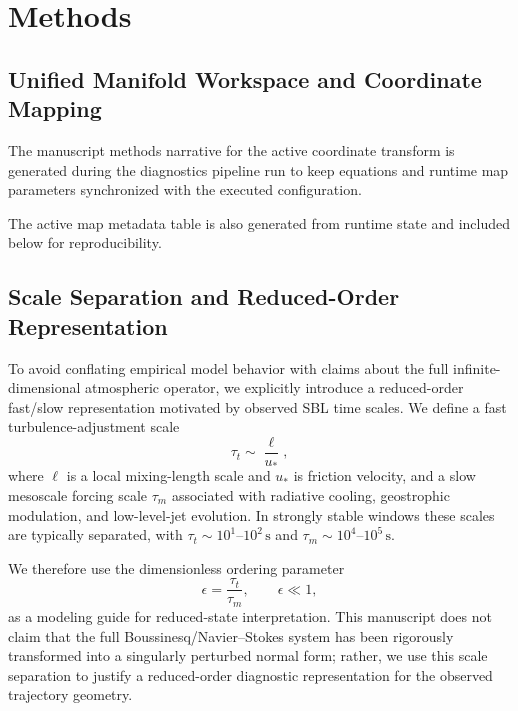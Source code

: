 \section{Methods}
\label{sec:methods}

\subsection{Unified Manifold Workspace and Coordinate Mapping}
\label{sec:methods:manifold}


The manuscript methods narrative for the active coordinate transform is generated during the diagnostics pipeline run to keep equations and runtime map parameters synchronized with the executed configuration.


The active map metadata table is also generated from runtime state and included below for reproducibility.


\subsection{Scale Separation and Reduced-Order Representation}
\label{sec:methods:scale_separation}

To avoid conflating empirical model behavior with claims about the full infinite-dimensional atmospheric operator, we explicitly introduce a reduced-order fast/slow representation motivated by observed SBL time scales. We define a fast turbulence-adjustment scale
\begin{equation}
\tau_t \sim \frac{\ell}{u_*},
\end{equation}
where $\ell$ is a local mixing-length scale and $u_*$ is friction velocity, and a slow mesoscale forcing scale $\tau_m$ associated with radiative cooling, geostrophic modulation, and low-level-jet evolution. In strongly stable windows these scales are typically separated, with $\tau_t \sim 10^{1}$--$10^{2}\,\mathrm{s}$ and $\tau_m \sim 10^{4}$--$10^{5}\,\mathrm{s}$.

We therefore use the dimensionless ordering parameter
\begin{equation}
\epsilon = \frac{\tau_t}{\tau_m}, \qquad \epsilon \ll 1,
\end{equation}
as a modeling guide for reduced-state interpretation. This manuscript does not claim that the full Boussinesq/Navier--Stokes system has been rigorously transformed into a singularly perturbed normal form; rather, we use this scale separation to justify a reduced-order diagnostic representation for the observed trajectory geometry.


